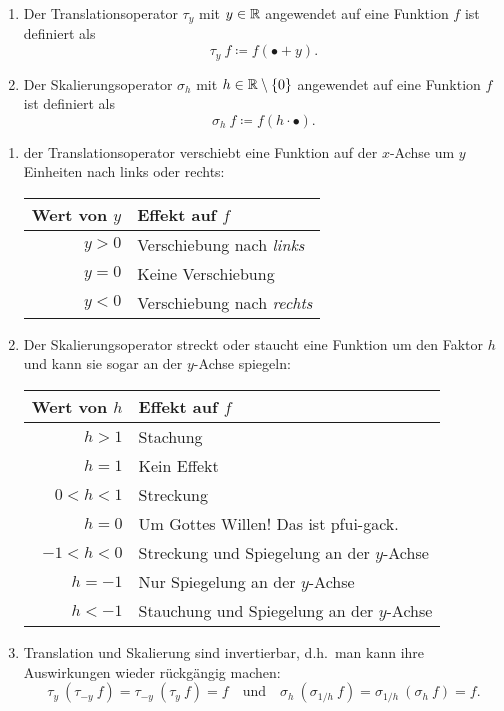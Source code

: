 \begin{definition} \leavevmode
\begin{enumerate}
\item Der Translationsoperator $ \tau_{y} $ mit $ y \in \mathbb{R} $ angewendet auf eine Funktion $ f $ ist 
definiert als
\[ \tau_{y} \ f \coloneqq f(\bullet + y). \]
\item Der Skalierungsoperator $ \sigma_{h} $ mit $ h \in \mathbb{R} \setminus \{ 0 \} $ angewendet auf eine 
Funktion $ f $ ist definiert als
\[ \sigma_{h} \ f \coloneqq f(h \cdot \bullet). \]
\end{enumerate}
\end{definition}

\begin{remark} \leavevmode
\begin{enumerate}
\item der Translationsoperator verschiebt eine Funktion auf der $ x $-Achse um $ y $ Einheiten nach 
links oder rechts:
\par
\begin{center}
  \begin{tabular}{rl} \toprule
  Wert von $ y $ & Effekt auf $ f $ \\ \midrule
  $ y > 0 $ & Verschiebung nach \emph{links} \\
  $ y = 0 $ & Keine Verschiebung \\
  $ y < 0 $ & Verschiebung nach \emph{rechts} \\ \bottomrule
  \end{tabular}
\end{center}
\item Der Skalierungsoperator streckt oder staucht eine Funktion um den Faktor $ h $ und kann sie 
sogar an der $ y $-Achse spiegeln:\par
\begin{center}
  \begin{tabular}{rl} \toprule
  Wert von $ h $ & Effekt auf $ f $ \\ \midrule
  $ h > 1 $ & Stachung \\
  $ h = 1 $ & Kein Effekt \\
  $ 0 < h < 1 $ & Streckung \\ \midrule
  $ h = 0 $ & Um Gottes Willen! Das ist pfui-gack. \\ \midrule
  $ -1 < h < 0 $ & Streckung und Spiegelung an der $ y $-Achse \\
  $ h = -1 $ & Nur Spiegelung an der $ y $-Achse \\
  $ h < -1 $ & Stauchung und Spiegelung an der $ y $-Achse \\ \bottomrule
  \end{tabular}
\end{center}
\item Translation und Skalierung sind invertierbar, d.h.\ man kann ihre Auswirkungen wieder
rückgängig machen:
\[
  \tau_{y} \ (\tau_{-y} \ f) = \tau_{-y} \ (\tau_{y} \ f) = f \quad \text{und} \quad
  \sigma_{h} \ (\sigma_{1/h} \ f) = \sigma_{1/h} \ (\sigma_{h} \ f) = f.
\]
\end{enumerate}
\end{remark}

